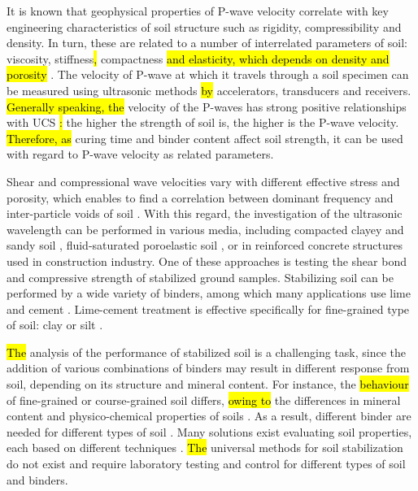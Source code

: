 \documentclass[USenglish,twocolumn]{article}
\begin{document}
It is known that geophysical properties of P-wave velocity correlate with key engineering characteristics of soil structure\hl{ }such as rigidity, compressibility\hl{ }and density. In turn, these are related to a number of interrelated parameters of soil:\hl{ }viscosity, stiffness\hl{, }compactness\hl{ and elasticity, which depends on density and porosity }\cite{askeland2008essentials,askeland2005science}. The velocity of P-wave at which it travels through a soil specimen can be measured using ultrasonic methods \hl{by} accelerators, transducers and receivers. \hl{Generally speaking, the }velocity of the P-waves has strong positive relationships with UCS \cite{Sarno,Pellet}\hl{: }the higher the strength of soil is, the higher is the P-wave velocity. \hl{Therefore, as }curing time and binder content affect soil strength, it can be used with regard to P-wave velocity as related parameters. 

Shear and compressional wave velocities vary with different effective stress and porosity, which enables to find a correlation between dominant frequency and inter-particle voids of soil \cite{Gheibi}. With this regard, the investigation of the ultrasonic wavelength can be performed in various media, including compacted clayey and sandy soil \cite{Sarroetal2021}, fluid-saturated poroelastic soil \cite{Shietal2017}, or in reinforced concrete structures \cite{Carpinteri,Aggelis} used in construction industry. One of these approaches is testing the shear bond and compressive strength of stabilized ground samples. Stabilizing soil can be performed by a wide variety of binders, among which many applications use lime \cite{DiSanteetal2020,LindhLemenkova2022CEE} and cement \cite{Lemenkova202222}. Lime-cement treatment is effective specifically for fine-grained type of soil: clay or silt \cite{Brice,Heath,Addison,Rogers,Solanki}.  

\hl{The }analysis of the performance of stabilized soil is a challenging task, since the addition of various combinations of binders may result in different response from soil, depending on its structure and mineral content. For instance, the \hl{behaviour} of fine-grained \cite{Mitchell} or course-grained soil \cite{Wangetal2009} differs, \hl{owing to} the differences in mineral content and physico-chemical properties of soils \cite{Lambe}. As a result, different binder are needed for different types of soil \cite{Lindh2001,Guoetal2003}. Many solutions exist evaluating soil properties, each based on different techniques \cite{Lindh2004,Glendinning,Lindh202201,NIGITHA2022,Lemenkov2021c}. \hl{The }universal methods for soil stabilization do not exist and require laboratory testing and control for different types of soil and binders.
\end{document}
